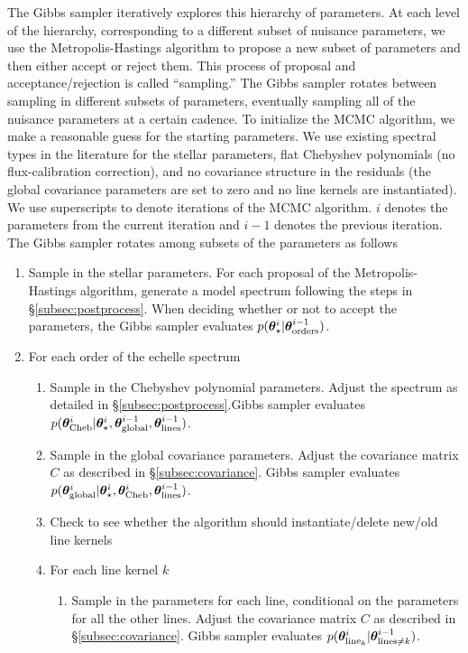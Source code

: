 \documentclass[preprint]{aastex} %
\newcommand{\vt}{ {\bm \theta}}
\newcommand{\vtstar}{\vt_{\star}}
\newcommand{\vtcheb}{\vt_{\rm Cheb}}
\newcommand{\vtglobal}{\vt_{\rm global}}
\newcommand{\vtorders}{\vt_{\rm orders}}
\newcommand{\vtline}[1]{\vt_{{\rm line}_{#1}}}
\newcommand{\vtlines}{\vt_{\rm lines}}
\begin{document}
The Gibbs sampler iteratively explores this hierarchy of parameters. At each level of the hierarchy, corresponding to a different subset of nuisance parameters, we use the Metropolis-Hastings algorithm to propose a new subset of parameters and then either accept or reject them. This process of proposal and acceptance/rejection is called ``sampling.'' The Gibbs sampler rotates between sampling in different subsets of parameters, eventually sampling all of the nuisance parameters at a certain cadence. To initialize the MCMC algorithm, we make a reasonable guess for the starting parameters. We use existing spectral types in the literature for the stellar parameters, flat Chebyshev polynomials (no flux-calibration correction), and no covariance structure in the residuals (the global covariance parameters are set to zero and no line kernels are instantiated). We use superscripts to denote iterations of the MCMC algorithm. $i$ denotes the parameters from the current iteration and $i - 1$ denotes the previous iteration. The Gibbs sampler rotates among subsets of the parameters as follows 

\begin{enumerate}
  \item Sample in the stellar parameters. For each proposal of the Metropolis-Hastings algorithm, generate a model spectrum following the steps in \S\ref{subsec:postprocess}. When deciding whether or not to accept the parameters, the Gibbs sampler evaluates $p(\vtstar^i | \vtorders^{i-1})$.
  \item For each order of the echelle spectrum
    \begin{enumerate}
      \item Sample in the Chebyshev polynomial parameters. Adjust the spectrum as detailed in \S\ref{subsec:postprocess}.Gibbs sampler evaluates $p(\vtcheb^{i} | \vtstar^{i}, \vtglobal^{i -1}, \vtlines^{i-1})$.
      \item Sample in the global covariance parameters. Adjust the covariance matrix $C$ as described in \S\ref{subsec:covariance}. Gibbs sampler evaluates $p(\vtglobal^{i}| \vtstar^{i}, \vtcheb^{i}, \vtlines^{i -1})$.

      \item Check to see whether the algorithm should instantiate/delete new/old line kernels
      \item For each line kernel $k$
	\begin{enumerate}
	  \item Sample in the parameters for each line, conditional on the parameters for all the other lines. Adjust the covariance matrix $C$ as described in \S\ref{subsec:covariance}. Gibbs sampler evaluates $p(\vtline{k}^i| \vt_{\textrm{lines}\ne k}^{i - 1})$.
	\end{enumerate}
    \end{enumerate}
\end{enumerate}
\end{document}
